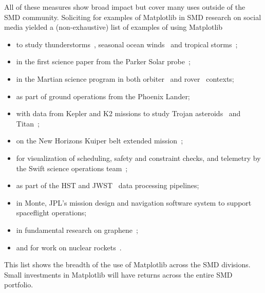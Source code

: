 \documentclass[12pt]{article}
\numberwithin{page}{section}
\begin{document}
All of these measures show broad impact but cover many uses outside of
the SMD community.  Soliciting for examples of
Matplotlib in SMD research on social media yielded a (non-exhaustive)
list of examples of using Matplotlib
\begin{itemize}[noitemsep]
\item
  to study
  thunderstorms~\cite{https://doi.org/10.1002/2016JD025299,https://doi.org/10.1029/2019JD030874},
  seasonal ocean winds~\cite{https://doi.org/10.1002/2017JD027516} and
  tropical storms~\cite{Lang_2020};
\item in the first science paper from the Parker Solar
  probe~\cite{Bale2019};
\item in the Martian science program in both
  orbiter~\cite{https://doi.org/10.1029/2019JE006188} and
  rover~\cite{https://doi.org/10.1002/2016EA000219} contexts;
\item as part of ground operations from the Phoenix Lander;
\item with data from Kepler and K2 missions to study Trojan
  asteroids~\cite{Nixon_2019} and
  Titan~\cite{Ryan_2017,2019PASP..131h4505P};
\item on the New Horizons Kuiper belt extended
  mission~\cite{Porter_2018};
\item for visualization of scheduling, safety and constraint checks,
  and telemetry by the Swift science operations
  team~\cite{swift_ops,2020ApJ...900...35T};
\item as part of the HST and JWST~\cite{jwst_pipeline} data processing
  pipelines;
\item in Monte, JPL's mission design
  and navigation software system to support spaceflight operations;
\item in fundamental research on graphene~\cite{PhysRevLett.120.236802};
\item and for work on nuclear rockets~\cite{leu_cerment}.
\end{itemize}
This list shows the breadth of the use of Matplotlib across the SMD
divisions.  Small investments in Matplotlib will have returns across
the entire SMD portfolio.
\end{document}
